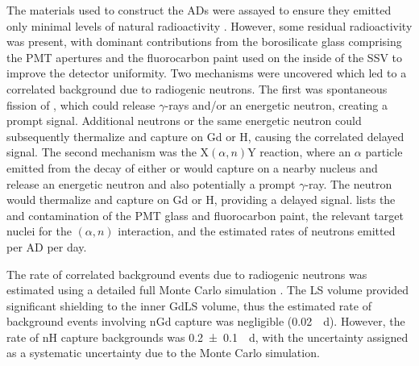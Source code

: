 The materials used to construct the ADs were
assayed to ensure they emitted only minimal levels of natural radioactivity
\cite{sidebyside}.
However, some residual radioactivity was present,
with dominant contributions from the borosilicate glass comprising the PMT apertures
and the fluorocarbon paint \cite{fluorocarbon_paint} used on the inside of the SSV
to improve the detector uniformity.
Two mechanisms were uncovered which led to a correlated background
due to radiogenic neutrons\cite{rad_n_intro}.
The first was spontaneous fission of ,
which could release $\gamma$-rays and/or an energetic neutron,
creating a prompt signal.
Additional neutrons or the same energetic neutron
could subsequently thermalize and capture on Gd or H,
causing the correlated delayed signal.
The second mechanism was the $\text{X}(\alpha, n)\text{Y}$ reaction,
where an $\alpha$ particle emitted from the decay of
either  or 
would capture on a nearby nucleus
and release an energetic neutron and also potentially a prompt $\gamma$-ray.
The neutron would thermalize and capture on Gd or H, providing a delayed signal.
 lists the  and 
contamination of the PMT glass and fluorocarbon paint,
the relevant target nuclei for the $(\alpha,n)$ interaction,
and the estimated rates of neutrons emitted per AD per day.



The rate of correlated background events due to radiogenic neutrons
was estimated using a detailed full Monte Carlo simulation \cite{rad_n}.
The LS volume provided significant shielding to the inner GdLS volume,
thus the estimated rate of background events involving nGd capture
was negligible (\SI{0.02}{\per\day}).
However, the rate of nH capture backgrounds was \SI{0.2\pm0.1}{\per\day},
with the uncertainty assigned as a systematic uncertainty
due to the Monte Carlo simulation.

